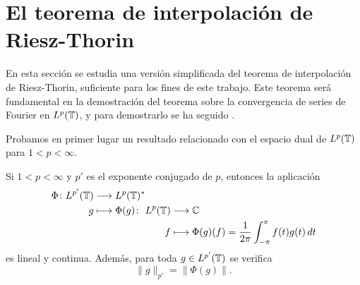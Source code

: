 \documentclass[a4paper, 12pt]{book}
\begin{document}
\section{El teorema de interpolación de Riesz-Thorin}

En esta sección se estudia una versión simplificada del teorema de interpolación de Riesz-Thorin, suficiente para los fines de este trabajo. Este teorema será fundamental en la demostración del teorema sobre la convergencia de series de Fourier en $L^p(\mathbb T)$, y para demostrarlo se ha seguido \cite{folland}.

Probamos en primer lugar un resultado relacionado con el espacio dual de $L^p(\mathbb T)$ para $1<p<\infty$.

\begin{lemma}
    Si $1 < p < \infty$ y $p'$ es el exponente conjugado de $p$, entonces la aplicación
    \[\begin{alignedat}{3}
        \Phi \colon L^{p'}(\mathbb T) &\longrightarrow L^p(\mathbb T)^* & & \\
        g &\longmapsto \Phi(g) \colon & L^p(\mathbb T) &\longrightarrow \mathbb C \\
        & & f &\longmapsto \Phi(g)(f)=\frac{1}{2\pi}\int_{-\pi}^{\pi} f(t)g(t) \, dt
    \end{alignedat}\]
    es lineal y continua. Además, para toda $g \in L^{p'}(\mathbb T)$ se verifica
    \[\|g\|_{p'} = \|\Phi(g)\|.\]
\end{lemma}
\end{document}
